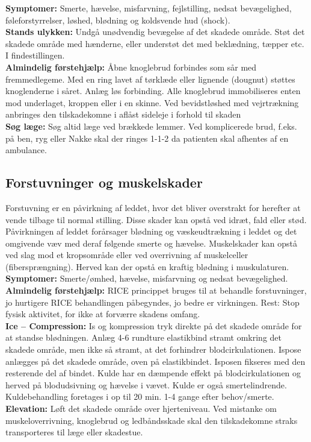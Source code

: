 \documentclass[../../../main.tex]{subfiles}
\begin{document}
\begin{multicols}{2}
\textbf{Symptomer:} Smerte, hævelse, misfarvning, fejlstilling, nedsat
bevægelighed, føleforstyrrelser, løshed, blødning og koldsvende hud (shock).
\\

\textbf{Stands ulykken:} Undgå unødvendig bevægelse af det skadede
område. Støt det skadede område med hænderne, eller understøt det med beklædning, tæpper etc. I findestillingen.
\\

\textbf{Almindelig førstehjælp:} Åbne knoglebrud forbindes som sår med
fremmedlegeme. Med en ring lavet af tørklæde eller lignende (dougnut) støttes
knoglenderne i såret. Anlæg løs forbinding. Alle knoglebrud immobiliseres enten mod underlaget, kroppen eller i en skinne. Ved bevidstløshed med vejrtrækning anbringes den tilskadekomne i aflåst sideleje i forhold til skaden
\\

\textbf{Søg læge:} Søg altid læge ved brækkede lemmer. Ved komplicerede brud, f.eks. på ben, ryg eller Nakke skal der ringes 1-1-2 da patienten skal afhentes af en ambulance. 
\\
\subsection*{Forstuvninger og muskelskader} Forstuvning er en påvirkning af leddet, hvor det bliver overstrakt for herefter at vende tilbage til normal stilling. Disse skader kan opstå ved idræt, fald eller stød. Påvirkningen af leddet forårsager blødning og væskeudtrækning i leddet og det omgivende væv med deraf følgende smerte og hævelse. Muskelskader kan opstå ved slag mod et kropsområde eller ved overrivning af muskelceller (fibersprængning). Herved kan der opstå en kraftig blødning i muskulaturen.
\\

\textbf{Symptomer:} Smerte/ømhed, hævelse, misfarvning og nedsat
bevægelighed.
\\

\textbf{Almindelig førstehjælp:} RICE princippet bruges til at behandle forstuvninger, jo hurtigere RICE behandlingen påbegyndes, jo bedre er virkningen. Rest: Stop fysisk aktivitet, for ikke at forværre skadens omfang.
\\

\textbf{Ice – Compression:} Is og kompression tryk direkte på det skadede område for at standse blødningen. Anlæg 4-6 rundture elastikbind stramt omkring det skadede område, men ikke så stramt, at det forhindrer blodcirkulationen. Ispose anlægges på det skadede område, oven på elastikbindet. Isposen fikseres med den resterende del af bindet. Kulde har en dæmpende effekt på blodcirkulationen og herved på blodudsivning og hævelse i vævet. Kulde er også smertelindrende. Kuldebehandling foretages i op til 20 min. 1-4 gange efter behov/smerte.
\\

\textbf{Elevation:} Løft det skadede område over hjerteniveau. Ved mistanke om muskeloverrivning, knoglebrud og ledbåndsskade skal den tilskadekomne straks transporteres til læge eller skadestue.
\\
\end{multicols}
\end{document}
